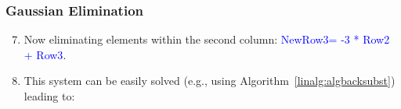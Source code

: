 \documentclass[10pt,compress,handout,ignorenonframetext]{beamer}
\begin{document}
\begin{frame}
  \frametitle{Gaussian Elimination} 
  \begin{enumerate}
  \setcounter{enumi}{6}
     \item <1-> Now eliminating elements within the second column: \textcolor{blue}{NewRow3= -3 * Row2 + Row3}.
   
     \item <3-> This system can be easily solved (e.g., using Algorithm~\ref{linalg:algbacksubst}) leading to:
  \end{enumerate}
\end{frame}
\end{document}
